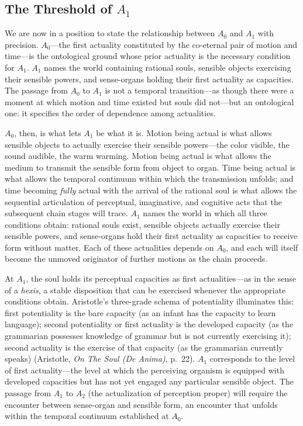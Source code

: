 \subsection*{The Threshold of $A_1$}

We are now in a position to state the relationship between $A_0$ and $A_1$ with precision. $A_0$---the first actuality constituted by the co-eternal pair of motion and time---is the ontological ground whose prior actuality is the necessary condition for $A_1$. $A_1$ names the world containing rational souls, sensible objects exercising their sensible powers, and sense-organs holding their first actuality as capacities. The passage from $A_0$ to $A_1$ is not a temporal transition---as though there were a moment at which motion and time existed but souls did not---but an ontological one: it specifies the order of dependence among actualities.

$A_0$, then, is what lets $A_1$ be what it is. Motion being actual is what allows sensible objects to actually exercise their sensible powers---the color visible, the sound audible, the warm warming. Motion being actual is what allows the medium to transmit the sensible form from object to organ. Time being actual is what allows the temporal continuum within which the transmission unfolds; and time becoming \textit{fully} actual with the arrival of the rational soul is what allows the sequential articulation of perceptual, imaginative, and cognitive acts that the subsequent chain stages will trace. $A_1$ names the world in which all three conditions obtain: rational souls exist, sensible objects actually exercise their sensible powers, and sense-organs hold their first actuality as capacities to receive form without matter. Each of these actualities depends on $A_0$, and each will itself become the unmoved originator of further motions as the chain proceeds.

At $A_1$, the soul holds its perceptual capacities as first actualities---as  in the sense of a \textit{hexis}, a stable disposition that can be exercised whenever the appropriate conditions obtain. Aristotle's three-grade schema of potentiality illuminates this: first potentiality is the bare capacity (as an infant has the capacity to learn language); second potentiality or first actuality is the developed capacity (as the grammarian possesses knowledge of grammar but is not currently exercising it); second actuality is the exercise of that capacity (as the grammarian currently speaks) (Aristotle, \textit{On The Soul (De Anima)}, p.~22). $A_1$ corresponds to the level of first actuality---the level at which the perceiving organism is equipped with developed capacities but has not yet engaged any particular sensible object. The passage from $A_1$ to $A_2$ (the actualization of perception proper) will require the encounter between sense-organ and sensible form, an encounter that unfolds within the temporal continuum established at $A_0$.

